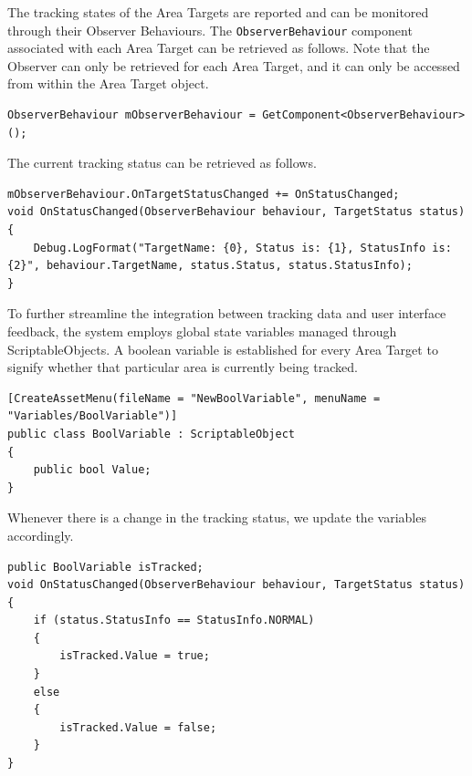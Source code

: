 The tracking states of the Area Targets are reported and can be monitored through their Observer Behaviours. The \texttt{ObserverBehaviour} component associated with each Area Target can be retrieved as follows. Note that the Observer can only be retrieved for each Area Target, and it can only be accessed from within the Area Target object.

\begin{lstlisting}[style=cSharp]
ObserverBehaviour mObserverBehaviour = GetComponent<ObserverBehaviour>();
\end{lstlisting}

The current tracking status can be retrieved as follows.

\begin{lstlisting}[style=cSharp]
mObserverBehaviour.OnTargetStatusChanged += OnStatusChanged;
void OnStatusChanged(ObserverBehaviour behaviour, TargetStatus status)
{
    Debug.LogFormat("TargetName: {0}, Status is: {1}, StatusInfo is: {2}", behaviour.TargetName, status.Status, status.StatusInfo);
}
\end{lstlisting}

To further streamline the integration between tracking data and user interface feedback, the system employs global state variables managed through ScriptableObjects. A boolean variable is established for every Area Target to signify whether that particular area is currently being tracked.

\begin{lstlisting}[style=cSharp]
[CreateAssetMenu(fileName = "NewBoolVariable", menuName = "Variables/BoolVariable")]
public class BoolVariable : ScriptableObject
{
    public bool Value;
}
\end{lstlisting}

Whenever there is a change in the tracking status, we update the variables accordingly.

\begin{lstlisting}[style=cSharp]
public BoolVariable isTracked;
void OnStatusChanged(ObserverBehaviour behaviour, TargetStatus status)
{
    if (status.StatusInfo == StatusInfo.NORMAL)
    {
        isTracked.Value = true;
    }
    else
    {
        isTracked.Value = false;
    }
}
\end{lstlisting}

